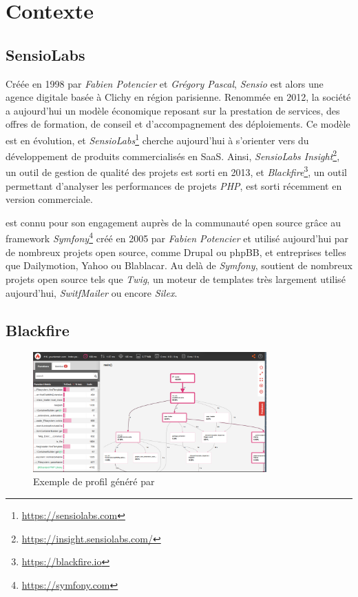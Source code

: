 \setcounter{part}{1}

\chapter{Contexte}
	\setcounter{chapter}{1}
	\section{SensioLabs}
Créée en 1998 par \emph{Fabien Potencier} et \emph{Grégory Pascal}, \emph{Sensio} est alors une agence digitale basée à Clichy en région parisienne. Renommée \SensioLabs en 2012, la société a aujourd'hui un modèle économique reposant sur la prestation de services, des offres de formation, de conseil et d'accompagnement des déploiements. Ce modèle est en évolution, et \emph{SensioLabs}\footnote{\url{https://sensiolabs.com}} cherche aujourd'hui à s'orienter vers du développement de produits commercialisés en \gls{SaaS}. Ainsi, \emph{SensioLabs Insight}\footnote{\url{https://insight.sensiolabs.com/}}, un outil de gestion de qualité des projets \PHP est sorti en 2013, et \emph{Blackfire}\footnote{\url{https://blackfire.io}}, un outil permettant d'analyser les performances de projets \emph{PHP}, est sorti récemment en version commerciale.

\SensioLabs est connu pour son engagement auprès de la communauté open source \PHP grâce au framework \emph{Symfony}\footnote{\url{https://symfony.com}} créé en 2005 par \emph{Fabien Potencier} et utilisé aujourd'hui par de nombreux projets open source, comme Drupal ou phpBB, et entreprises telles que Dailymotion, Yahoo ou Blablacar. Au delà de \emph{Symfony}, \SensioLabs soutient de nombreux projets open source \PHP tels que \emph{Twig}, un moteur de templates très largement utilisé aujourd'hui, \emph{SwitfMailer} ou encore \emph{Silex}.

	\section{Blackfire}

\begin{figure}[!h]
\begin{center}
    \includegraphics[width=0.8\textwidth]{images/blackfire-exemple}
  \caption{Exemple de profil généré par \Blackfire}
  \centering
\end{center}
\end{figure}

